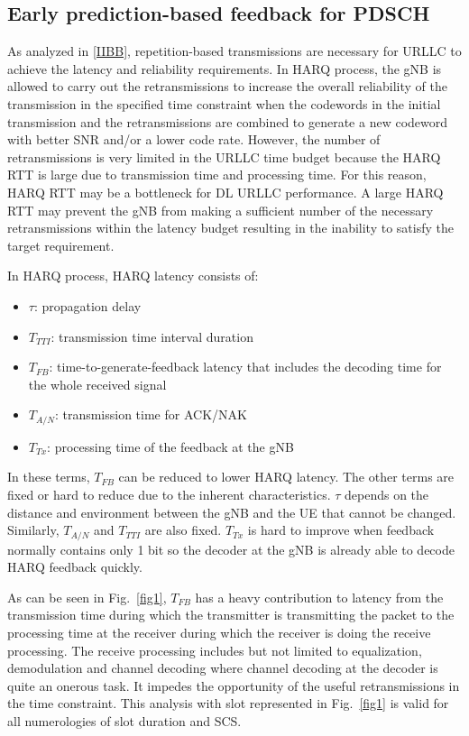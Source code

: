 \documentclass[conference]{IEEEtran}
\begin{document}
\subsection{Early prediction-based feedback for PDSCH}\label{AA}
As analyzed in \ref{IIBB}, repetition-based transmissions are necessary for URLLC to achieve the latency and reliability requirements. In HARQ process, the gNB is allowed to carry out the retransmissions to increase the overall reliability of the transmission in the specified time constraint when the codewords in the initial transmission and the retransmissions are combined to generate a new codeword with better SNR and/or a lower code rate.  However, the number of retransmissions is very limited in the URLLC time budget because the HARQ RTT is large due to transmission time and processing time. For this reason, HARQ RTT may be a bottleneck for DL URLLC performance. A large HARQ RTT may prevent the gNB from making a sufficient number of the necessary retransmissions within the latency budget resulting in the inability to satisfy the target requirement. 

In HARQ process, HARQ latency consists of:
\begin{itemize}
    \item $\tau$: propagation delay
    \item $T_{TTI}$: transmission time interval duration
    \item $T_{FB}$: time-to-generate-feedback latency that includes the decoding time for the whole received signal
    \item $T_{A/N}$: transmission time for ACK/NAK
    \item $T_{Tx}$: processing time of the feedback at the gNB
\end{itemize}

In these terms, $T_{FB}$ can be reduced to lower HARQ latency. The other terms are fixed or hard to reduce due to the inherent characteristics. $\tau$ depends on the distance and environment between the gNB and the UE that cannot be changed. Similarly, $T_{A/N}$ and $T_{TTI}$ are also fixed. $T_{Tx}$ is hard to improve when feedback normally contains only 1 bit so the decoder at the gNB is already able to decode HARQ feedback quickly. 

As can be seen in Fig.~\ref{fig1}, $T_{FB}$ has a heavy contribution to latency from the transmission time during which the transmitter is transmitting the packet to the processing time at the receiver during which the receiver is doing the receive processing. The receive processing includes but not limited to equalization, demodulation and channel decoding where channel decoding at the decoder is quite an onerous task. It impedes the opportunity of the useful retransmissions in the time constraint. This analysis with slot represented in Fig.~\ref{fig1} is valid for all numerologies of slot duration and SCS.
\end{document}

